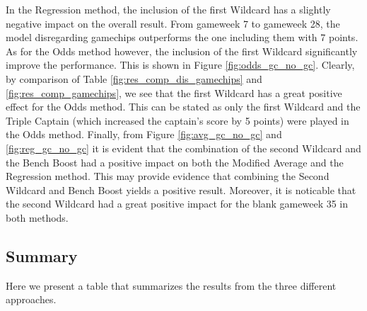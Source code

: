 \newpar
In the Regression method, the inclusion of the first Wildcard has a slightly negative impact on the overall result. From gameweek 7 to gameweek 28, the model disregarding gamechips outperforms the one including them with 7 points. 
\newpar
As for the Odds method however, the inclusion of the first Wildcard significantly improve the performance. This is shown in Figure \ref{fig:odds_gc_no_gc}. Clearly, by comparison of Table \ref{fig:res_comp_dis_gamechips} and \ref{fig:res_comp_gamechips}, we see that the first Wildcard has a great positive effect for the Odds method. This can be stated as only the first Wildcard and the Triple Captain (which increased the captain's score by 5 points) were played in the Odds method. 
\newpar
Finally, from Figure \ref{fig:avg_gc_no_gc} and \ref{fig:reg_gc_no_gc} it is evident that the combination of the second Wildcard and the Bench Boost had a positive impact on both the Modified Average and the Regression method. This may provide evidence that combining the Second Wildcard and Bench Boost yields a positive result. Moreover, it is noticable that the second Wildcard had a great positive impact for the blank gameweek 35 in both methods. 

\subsection{Summary}
Here we present a table that summarizes the results from the three different approaches. 

